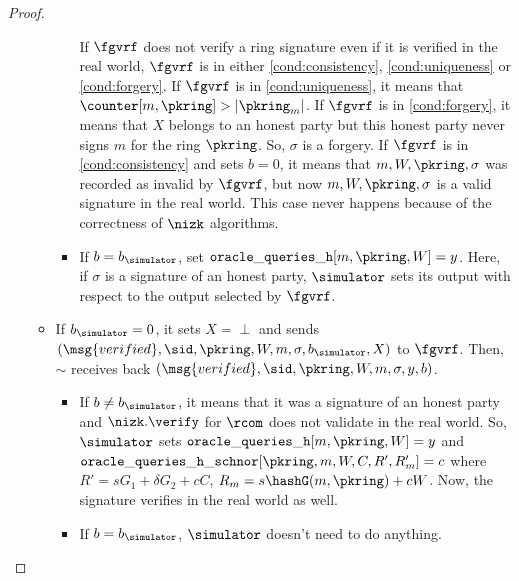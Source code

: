 \begin{proof}
\begin{itemize}
\begin{itemize}
\begin{itemize}
				If $ \fgvrf $ does not verify a ring signature even if  it is verified in the real world, $ \fgvrf $ is in either \ref{cond:consistency}, \ref{cond:uniqueness} or \ref{cond:forgery}.
				If $ \fgvrf $ is in \ref{cond:uniqueness}, it means that $ \counter[m,\pkring] > |\pkring_m| $. If $ \fgvrf $ is in \ref{cond:forgery}, it means that $ X $ belongs to an honest party but this honest party never signs $ m $ for the ring $ \pkring $. So, $ \sigma $ is a forgery.	If $ \fgvrf $ is in  \ref{cond:consistency} and sets $ b =0 $, it means that $ m, W, \pkring, \sigma $ was recorded as invalid by $ \fgvrf $, but now $ m, W, \pkring, \sigma $ is a valid signature in the real world. 
				This case never happens because of the correctness of $ \nizk $ algorithms. 
				
				\item If $ b = b_\simulator $, set $ \mathtt{oracle\_queries\_h}[m, \pkring,W] = y $. Here, if $ \sigma $ is a signature of an honest party, $ \simulator $ sets its output with respect to the output selected by $ \fgvrf $. 
			\end{itemize}
			\item If $ b_\simulator = 0 $, it sets $ X = \perp $ and sends  $ (\msg{verified}, \sid, \pkring, W, m, \sigma, b_\simulator, X) $ to $ \fgvrf $. Then, $ \sim $ receives back $ (\msg{verified}, \sid, \pkring, W, m, \sigma, y, b) $. 
			\begin{itemize}
				\item If $ b \neq b_\simulator $, it means that it was a signature of an honest party and $ \nizk.\verify $ for $ \rcom $ does not validate in the real world. So, $ \simulator $ sets $ \mathtt{oracle\_queries\_h}[m, \pkring,W] = y $ and $ \mathtt{oracle\_queries\_h\_schnor}[\pkring, m, W, C, R', R_m'] = c $ where $ R' = sG_1 + \delta G_2+ cC  $, $ R_m = s \hashG(m,\pkring) + cW$. 
				Now, the signature verifies in the real world as well.
				\item If $ b = b_\simulator $, $ \simulator $ doesn't need to do anything.
			\end{itemize}
			

\end{itemize}
\end{itemize}
\end{proof}
